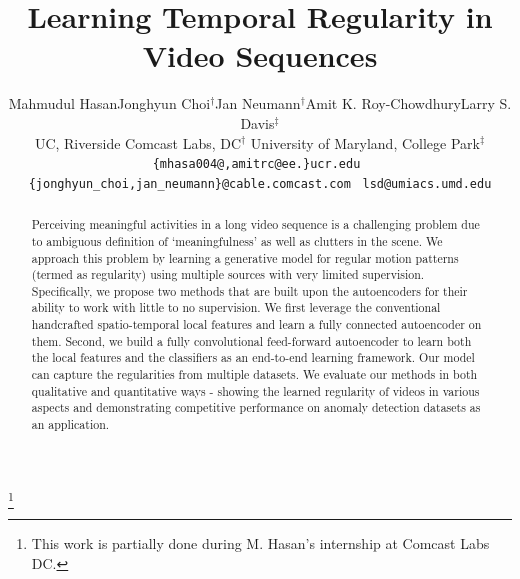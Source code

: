 \documentclass[10pt,twocolumn,letterpaper]{article}
\newcommand\blfootnote[1]{\begingroup
  \renewcommand\thefootnote{}\footnote{#1}\addtocounter{footnote}{-1}\endgroup
}
\begin{document}
\title{Learning Temporal Regularity in Video Sequences}



\author{
Mahmudul Hasan\hspace{1em}Jonghyun Choi$^\dagger$\hspace{1em}Jan Neumann$^\dagger$\hspace{1em}Amit K. Roy-Chowdhury\hspace{1em}Larry S. Davis$^\ddagger$
\vspace{0.5em}
\\
UC, Riverside\hspace{2em}
Comcast Labs, DC$^\dagger$\hspace{2em}
University of Maryland, College Park$^\ddagger$
\\
{\tt\footnotesize \{mhasa004@,amitrc@ee.\}ucr.edu}~
{\tt\footnotesize \{jonghyun\_choi,jan\_neumann\}@cable.comcast.com}~
{\tt\footnotesize lsd@umiacs.umd.edu}
}


\maketitle


\blfootnote{This work is partially done during M. Hasan's internship at Comcast Labs DC.}

\begin{abstract}


Perceiving meaningful activities in a long video sequence is a challenging problem due to ambiguous definition of `meaningfulness' as well as clutters in the scene.
We approach this problem by learning a generative model for regular motion patterns (termed as regularity) using multiple sources with very limited supervision.
Specifically, we propose two methods that are built upon the autoencoders for their ability to work with little to no supervision.
We first leverage the conventional handcrafted spatio-temporal local features and learn a fully connected autoencoder on them.
Second, we build a fully convolutional feed-forward autoencoder to learn both the local features and the classifiers as an end-to-end learning framework.
Our model can capture the regularities from multiple datasets.
We evaluate our methods in both qualitative and quantitative ways - showing the learned regularity of videos in various aspects and demonstrating competitive performance on anomaly detection datasets as an application.


%
 \end{abstract}
\end{document}
